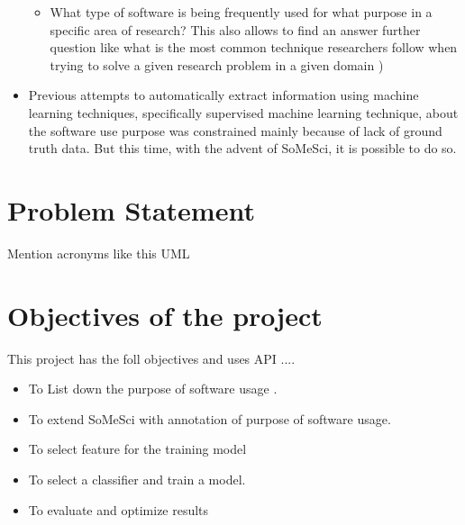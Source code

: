 \begin{itemize}
		\begin{itemize}
			\item What type of software is being frequently used for what purpose in a specific area of research? This also allows to find an answer further question like what is  the most common technique researchers follow when trying to solve a given research problem in a given domain )


		\end{itemize}	
	\item Previous attempts to automatically extract information using machine learning techniques, specifically supervised machine learning technique, about the software use purpose was constrained mainly because of lack of ground truth data. But this time, with the advent of SoMeSci, it is possible to do so. 	
	
\end{itemize}


%
%
\section{Problem Statement}
\label{sec:intro:problems}

Mention acronyms like this  \ac{UML} 


%
%
\section{Objectives of the project}
\label{sec:intro:objectives}

This project has the foll objectives and uses  \ac{API} ....

\begin{itemize} %

	\item To List down the purpose of software usage .
	\item To extend SoMeSci with annotation of purpose of software usage. 
	\item To select feature for the training model
	\item To select a classifier and train a model.
	\item To evaluate and optimize results 

\end{itemize}
\clearpage
